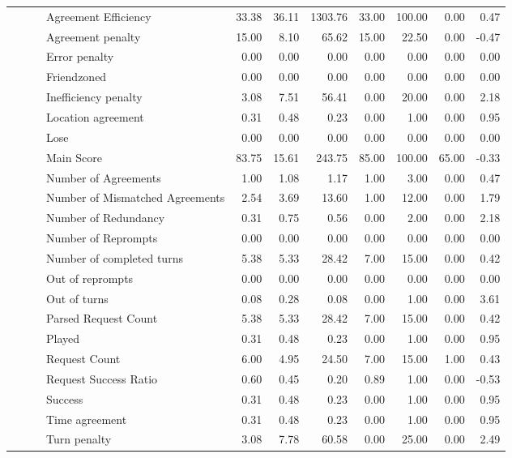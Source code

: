 \begin{tabular}{llllrrrrrrr}
 &  &  & Agreement Efficiency & 33.38 & 36.11 & 1303.76 & 33.00 & 100.00 & 0.00 & 0.47 \\
 &  &  & Agreement penalty & 15.00 & 8.10 & 65.62 & 15.00 & 22.50 & 0.00 & -0.47 \\
 &  &  & Error penalty & 0.00 & 0.00 & 0.00 & 0.00 & 0.00 & 0.00 & 0.00 \\
 &  &  & Friendzoned & 0.00 & 0.00 & 0.00 & 0.00 & 0.00 & 0.00 & 0.00 \\
 &  &  & Inefficiency penalty & 3.08 & 7.51 & 56.41 & 0.00 & 20.00 & 0.00 & 2.18 \\
 &  &  & Location agreement & 0.31 & 0.48 & 0.23 & 0.00 & 1.00 & 0.00 & 0.95 \\
 &  &  & Lose & 0.00 & 0.00 & 0.00 & 0.00 & 0.00 & 0.00 & 0.00 \\
 &  &  & Main Score & 83.75 & 15.61 & 243.75 & 85.00 & 100.00 & 65.00 & -0.33 \\
 &  &  & Number of Agreements & 1.00 & 1.08 & 1.17 & 1.00 & 3.00 & 0.00 & 0.47 \\
 &  &  & Number of Mismatched Agreements & 2.54 & 3.69 & 13.60 & 1.00 & 12.00 & 0.00 & 1.79 \\
 &  &  & Number of Redundancy & 0.31 & 0.75 & 0.56 & 0.00 & 2.00 & 0.00 & 2.18 \\
 &  &  & Number of Reprompts & 0.00 & 0.00 & 0.00 & 0.00 & 0.00 & 0.00 & 0.00 \\
 &  &  & Number of completed turns & 5.38 & 5.33 & 28.42 & 7.00 & 15.00 & 0.00 & 0.42 \\
 &  &  & Out of reprompts & 0.00 & 0.00 & 0.00 & 0.00 & 0.00 & 0.00 & 0.00 \\
 &  &  & Out of turns & 0.08 & 0.28 & 0.08 & 0.00 & 1.00 & 0.00 & 3.61 \\
 &  &  & Parsed Request Count & 5.38 & 5.33 & 28.42 & 7.00 & 15.00 & 0.00 & 0.42 \\
 &  &  & Played & 0.31 & 0.48 & 0.23 & 0.00 & 1.00 & 0.00 & 0.95 \\
 &  &  & Request Count & 6.00 & 4.95 & 24.50 & 7.00 & 15.00 & 1.00 & 0.43 \\
 &  &  & Request Success Ratio & 0.60 & 0.45 & 0.20 & 0.89 & 1.00 & 0.00 & -0.53 \\
 &  &  & Success & 0.31 & 0.48 & 0.23 & 0.00 & 1.00 & 0.00 & 0.95 \\
 &  &  & Time agreement & 0.31 & 0.48 & 0.23 & 0.00 & 1.00 & 0.00 & 0.95 \\
 &  &  & Turn penalty & 3.08 & 7.78 & 60.58 & 0.00 & 25.00 & 0.00 & 2.49 \\

\end{tabular}
